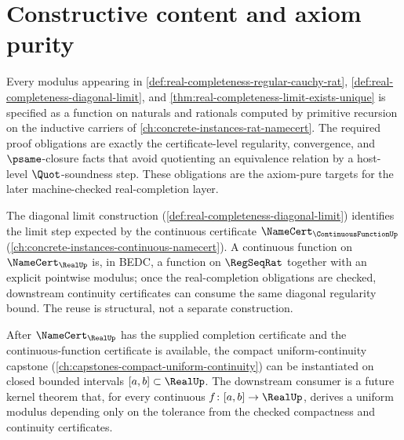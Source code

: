 

\section{Constructive content and axiom purity}
\label{sec:real-completeness-axiom-purity}

\begin{remark}
\label{rem:real-completeness-explicit-moduli}
Every modulus appearing in \autoref{def:real-completeness-regular-cauchy-rat}, \autoref{def:real-completeness-diagonal-limit}, and \autoref{thm:real-completeness-limit-exists-unique} is specified as a function on naturals and rationals computed by primitive recursion on the inductive carriers of \autoref{ch:concrete-instances-rat-namecert}. The required proof obligations are exactly the certificate-level regularity, convergence, and $\psame$-closure facts that avoid quotienting an equivalence relation by a host-level $\Quot$-soundness step. These obligations are the axiom-pure targets for the later machine-checked real-completion layer.
\end{remark}

\begin{remark}
\label{rem:real-completeness-reuse-continuous}
The diagonal limit construction (\autoref{def:real-completeness-diagonal-limit}) identifies the limit step expected by the continuous certificate $\NameCert_{\ContinuousFunctionUp}$ (\autoref{ch:concrete-instances-continuous-namecert}). A continuous function on $\NameCert_{\RealUp}$ is, in BEDC, a function on $\RegSeqRat$ together with an explicit pointwise modulus; once the real-completion obligations are checked, downstream continuity certificates can consume the same diagonal regularity bound. The reuse is structural, not a separate construction.
\end{remark}

\begin{remark}
\label{rem:real-completeness-compact-composition}
After $\NameCert_{\RealUp}$ has the supplied completion certificate and the continuous-function certificate is available, the compact uniform-continuity capstone (\autoref{ch:capstones-compact-uniform-continuity}) can be instantiated on closed bounded intervals $[a, b] \subset \RealUp$. The downstream consumer is a future kernel theorem that, for every continuous $f \colon [a, b] \to \RealUp$, derives a uniform modulus depending only on the tolerance from the checked compactness and continuity certificates.
\end{remark}

